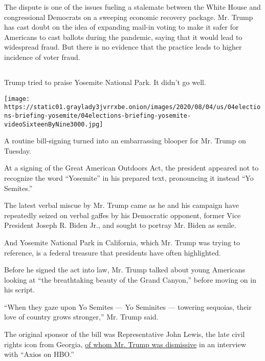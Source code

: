 The dispute is one of the issues fueling a stalemate between the White
House and congressional Democrats on a sweeping economic recovery
package. Mr. Trump has cast doubt on the idea of expanding mail-in
voting to make it safer for Americans to cast ballots during the
pandemic, saying that it would lead to widespread fraud. But there is no
evidence that the practice leads to higher incidence of voter fraud.

\hypertarget{section-3}{%
\subsection{}\label{section-3}}

Trump tried to praise Yosemite National Park. It didn't go well.

\texttt{[image: https://static01.graylady3jvrrxbe.onion/images/2020/08/04/us/04elections-briefing-yosemite/04elections-briefing-yosemite-videoSixteenByNine3000.jpg]}

A routine bill-signing turned into an embarrassing blooper for Mr. Trump
on Tuesday.

At a signing of the Great American Outdoors Act, the president appeared
not to recognize the word ``Yosemite'' in his prepared text, pronouncing
it instead ``Yo Semites.''

The latest verbal miscue by Mr. Trump came as he and his campaign have
repeatedly seized on verbal gaffes by his Democratic opponent, former
Vice President Joseph R. Biden Jr., and sought to portray Mr. Biden as
senile.

And Yosemite National Park in California, which Mr. Trump was trying to
reference, is a federal treasure that presidents have often highlighted.

Before he signed the act into law, Mr. Trump talked about young
Americans looking at ``the breathtaking beauty of the Grand Canyon,''
before moving on in his script.

``When they gaze upon Yo Semites --- Yo Seminites --- towering sequoias,
their love of country grows stronger,'' Mr. Trump said.

The original sponsor of the bill was Representative John Lewis, the late
civil rights icon from Georgia,
\href{https://www.nytimes3xbfgragh.onion/2020/08/04/us/politics/trump-john-lewis-axios.html}{of
whom Mr. Trump was dismissive} in an interview with ``Axios on HBO.''

\hypertarget{section-4}{%
\subsection{}\label{section-4}}

